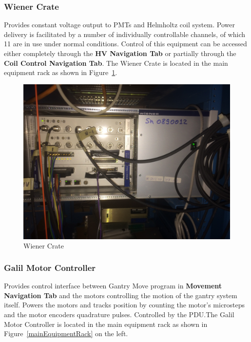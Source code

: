 \documentclass[twoside,letterpaper]{refart}
\newcommand{\picwidth}{0.7 \textwidth}
\begin{document}
\FloatBarrier

\subsubsection{Wiener Crate}

Provides constant voltage output to PMTs and Helmholtz coil system. Power delivery is facilitated by a number of individually controllable channels, of which 11 are in use under normal conditions. Control of this equipment can be accessed either completely through the \textbf{HV Navigation Tab} or partially through the \textbf{Coil Control Navigation Tab}. The Wiener Crate is located in the main equipment rack as shown in Figure~\ref{wiener}.

\FloatBarrier

\begin{figure}[!htpb]\centering	
	\includegraphics[width=\picwidth]{images/wiener}
	\caption{Wiener Crate\label{wiener}}
\end{figure}

\FloatBarrier

\clearpage

\subsubsection{Galil Motor Controller}

Provides control interface between Gantry Move program in \textbf{Movement Navigation Tab} and the motors controlling the motion of the gantry system itself. Powers the motors and tracks position by counting the motor's microsteps and the motor encoders quadrature pulses. Controlled by the PDU.\@ The Galil Motor Controller is located in the main equipment rack as shown in Figure~\ref{mainEquipmentRack} on the left.
\end{document}
